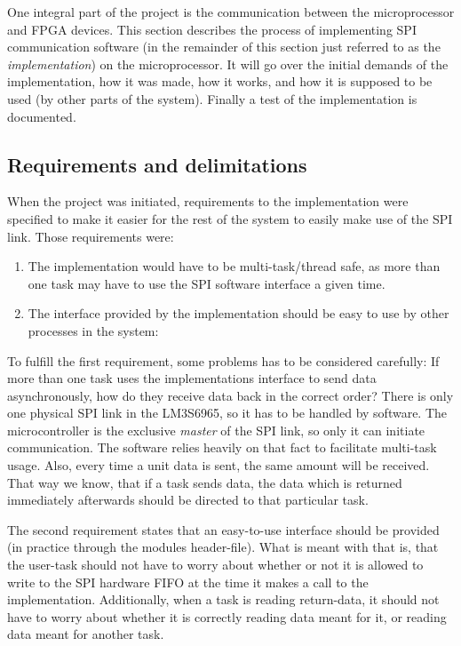 One integral part of the project is the communication between the microprocessor and FPGA devices. This section describes the process of implementing SPI communication software (in the remainder of this section just referred to as the \textit{implementation}) on the microprocessor. It will go over the initial demands of the implementation, how it was made, how it works, and how it is supposed to be used (by other parts of the system). Finally a test of the implementation is documented.

\subsection{Requirements and delimitations}\label{sec:spi_software_reqs}
When the project was initiated, requirements to the implementation were specified to make it easier for the rest of the system to easily make use of the SPI link. Those requirements were:
\begin{enumerate}
  \item The implementation would have to be multi-task/thread safe, as more than one task may have to use the SPI software interface a given time.
  \item The interface provided by the implementation should be easy to use by other processes in the system:
\end{enumerate}

To fulfill the first requirement, some problems has to be considered carefully: If more than one task uses the implementations interface to send data asynchronously, how do they receive data back in the correct order? There is only one physical SPI link in the LM3S6965, so it has to be handled by software.
The microcontroller is the exclusive \textit{master} of the SPI link, so only it can initiate communication. The software relies heavily on that fact to facilitate multi-task usage. Also, every time a unit data is sent, the same amount will be received. That way we know, that if a task sends data, the data which is returned immediately afterwards should be directed to that particular task.

The second requirement states that an easy-to-use interface should be provided (in practice through the modules header-file). What is meant with that is, that the user-task should not have to worry about whether or not it is allowed to write to the SPI hardware FIFO at the time it makes a call to the implementation. Additionally, when a task is reading return-data, it should not have to worry about whether it is correctly reading data meant for it, or reading data meant for another task.

